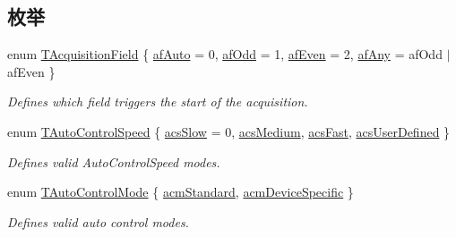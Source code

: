 \subsection*{枚举}
\begin{DoxyCompactItemize}
\item 
enum \hyperlink{group___device_specific_interface_gac2b87599c04c1ca9aa8c8a412c8a5518}{T\+Acquisition\+Field} \{ \hyperlink{group___device_specific_interface_ggac2b87599c04c1ca9aa8c8a412c8a5518aefe24fa9167f4f5a20f57c4c3e1abfdf}{af\+Auto} = 0, 
\hyperlink{group___device_specific_interface_ggac2b87599c04c1ca9aa8c8a412c8a5518aa1f546971cd509470e172113a87d167a}{af\+Odd} = 1, 
\hyperlink{group___device_specific_interface_ggac2b87599c04c1ca9aa8c8a412c8a5518ab89e68ac09fa76493c3d7083817dabba}{af\+Even} = 2, 
\hyperlink{group___device_specific_interface_ggac2b87599c04c1ca9aa8c8a412c8a5518a1936a10de4c9d1b66dc9a743c4acba4c}{af\+Any} = af\+Odd $\vert$ af\+Even
 \}
\begin{DoxyCompactList}\small\item\em Defines which field triggers the start of the acquisition. \end{DoxyCompactList}\item 
enum \hyperlink{group___device_specific_interface_ga363635dbd1401b0d852e9918eba2187f}{T\+Auto\+Control\+Speed} \{ \hyperlink{group___device_specific_interface_gga363635dbd1401b0d852e9918eba2187fabf99463345d59319bf52775f161d0574}{acs\+Slow} = 0, 
\hyperlink{group___device_specific_interface_gga363635dbd1401b0d852e9918eba2187fa3b6468dd6b60d1b88306ee3e358b982e}{acs\+Medium}, 
\hyperlink{group___device_specific_interface_gga363635dbd1401b0d852e9918eba2187faa6fd67e2848f3cea33459b60ab5e2247}{acs\+Fast}, 
\hyperlink{group___device_specific_interface_gga363635dbd1401b0d852e9918eba2187fa1f6492a1d33890c419c09e857ccb0165}{acs\+User\+Defined}
 \}
\begin{DoxyCompactList}\small\item\em Defines valid Auto\+Control\+Speed modes. \end{DoxyCompactList}\item 
enum \hyperlink{group___device_specific_interface_gaa686f613e70c03c31a58674a71fb318d}{T\+Auto\+Control\+Mode} \{ \hyperlink{group___device_specific_interface_ggaa686f613e70c03c31a58674a71fb318da8896fa480711373e0e1963c1db2379de}{acm\+Standard}, 
\hyperlink{group___device_specific_interface_ggaa686f613e70c03c31a58674a71fb318dae3e251193256552950ea0f3d49c38c21}{acm\+Device\+Specific}
 \}
\begin{DoxyCompactList}\small\item\em Defines valid auto control modes. \end{DoxyCompactList}\item 

\end{DoxyCompactItemize}
